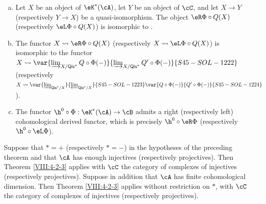 \begin{theorem}
\begin{enumerate}[a)]
    The restriction of the functor
    $Q'\circ \Phi:\eK^\ast(\cA) \to \eD^{\ast'}(\cB)$ to $\cC$ vanishes on the
    objects of $\cN$ and therefore factors through $\cC/\cN$. This gives
    a functor $\Phi':\cC/\cN\to \eD^{\ast'}(\cB)$. But the natural
    functor $\cC/\cN\to \eD^\ast(\cA)$ is an equivalence of categories
    (Theorem \ref{VIII:2-4-2}). Composing with its quasi-inverse gives the
    functor $\eR\Phi$ (respectively $\eL \Phi$).
  \item Let $X$ be an object of $\eK^\ast(\cA)$, let $Y$ be an object of
    $\cC$, and let $X\to Y$ (respectively $Y\to X$) be a
    quasi-isomorphism. The object $\eR\Phi\circ Q(X)$ (respectively
    $\eL \Phi\circ Q(X)$) is isomorphic to .
  \item The functor $X\leadsto \eR\Phi\circ Q(X)$ (respectively
    $X\leadsto \eL \Phi\circ Q(X)$) is isomorphic to the functor
    $X\leadsto \var{\varinjlim_{X/\mathsf{Qis}^\ast} Q\circ\Phi(-)}{\varinjlim_{X/\mathsf{Qis}^\ast} Q'\circ\Phi(-)}{S45-SOL-1222}$
    (respectively
    $X\leadsto \var{\varinjlim_{\mathsf{Qis}^\ast/X}}{\varprojlim_{\mathsf{Qis}^\ast/X}}{S45-SOL-1223} \var{Q\circ \Phi(-)}{Q'\circ \Phi(-)}{S45-SOL-1224}$).
  \item The functor $\h^0{}\circ \Phi:\eK^\ast(\cA)\to \cB$ admits a
    right (respectively left) cohomological derived functor, which is
    precisely $\h^0{}\circ\eR\Phi$ (respectively
    $\h^0{}\circ \eL\Phi$).
\end{enumerate}
\end{theorem}

\begin{corollary}\label{VIII:4-2-3-1} %
Suppose that $\ast=+$ (respectively $\ast=-$) in the hypotheses of the
preceding theorem and that $\cA$ has enough injectives (respectively
projectives). Then Theorem \ref{VIII:4-2-3} applies with $\cC$ the
category of complexes of injectives (respectively projectives). Suppose
in addition that $\cA$ has finite cohomological dimension. Then Theorem \ref{VIII:4-2-3} applies without restriction on $\ast$, with $\cC$ the category
of complexes of injectives (respectively projectives).
\end{corollary}

